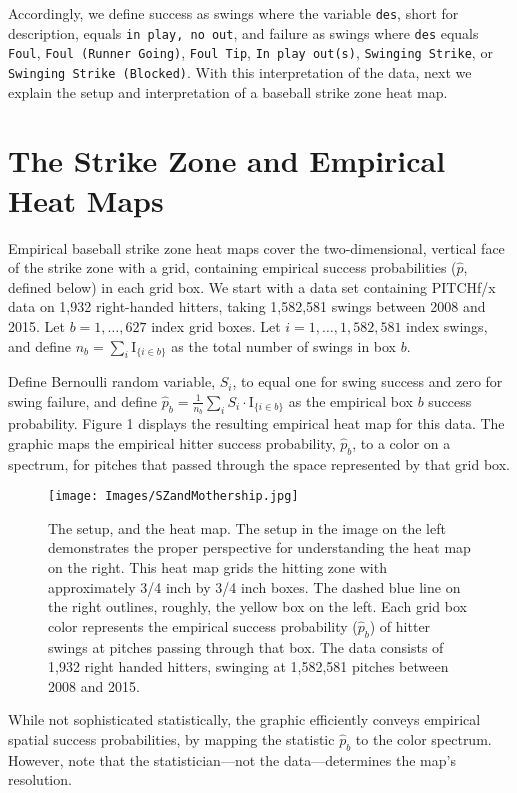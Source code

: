 Accordingly, we define success as swings where the variable \verb|des|, short for description, equals \verb|in play, no out|, and failure as swings where \verb|des| equals \verb|Foul|, \verb|Foul (Runner Going)|, \verb|Foul Tip|, \verb|In play out(s)|, \verb|Swinging Strike|, or \\ \verb|Swinging Strike (Blocked)|. With this interpretation of the data, next we explain the setup and interpretation of a baseball strike zone heat map.

\section{The Strike Zone and Empirical Heat Maps}

Empirical baseball strike zone heat maps cover the two-dimensional, vertical face of the strike zone with a grid, containing empirical success probabilities ($\hat{p}$, defined below) in each grid box.  We start with a data set containing PITCHf/x\textsuperscript{\textregistered} data on 1,932 right-handed hitters, taking 1,582,581 swings between 2008 and 2015.  Let $b = 1, \dots, 627$ index grid boxes. Let $i = 1, \dots, 1,582,581$ index swings, and define $n_{b} = \displaystyle\sum_{i} \text{I}_{\{i \in b \}}$ as the total number of swings in box $b$.

Define Bernoulli random variable, $S_{i}$, to equal one for swing success and zero for swing failure, and define $\hat{p}_{b} = \frac{1}{n_{b}} \displaystyle\sum_{i} S_{i} \cdot \text{I}_{\{i \in b \}}$ as the empirical box $b$ success probability. Figure 1 displays the resulting empirical heat map for this data. The graphic maps the empirical hitter success probability, $\hat{p}_{b}$, to a color on a spectrum, for pitches that passed through the space represented by that grid box.
  \begin{figure}[H]
	\centering
	\texttt{[image: Images/SZandMothership.jpg]} 
  \caption{The setup, and the heat map. The setup in the image on the left demonstrates the proper perspective for understanding the heat map on the right. This heat map grids the hitting zone with approximately 3/4 inch by 3/4 inch boxes. The dashed blue line on the right outlines, roughly, the yellow box on the left. Each grid box color represents the empirical success probability ($\hat{p}_{b}$) of hitter swings at pitches passing through that box.  The data consists of 1,932 right handed hitters, swinging at 1,582,581 pitches between 2008 and 2015.}
	\end{figure} 
While not sophisticated statistically, the graphic efficiently conveys empirical spatial success probabilities, by mapping the statistic $\hat{p}_{b}$ to the color spectrum. However, note that the statistician---not the data---determines the map's resolution.


